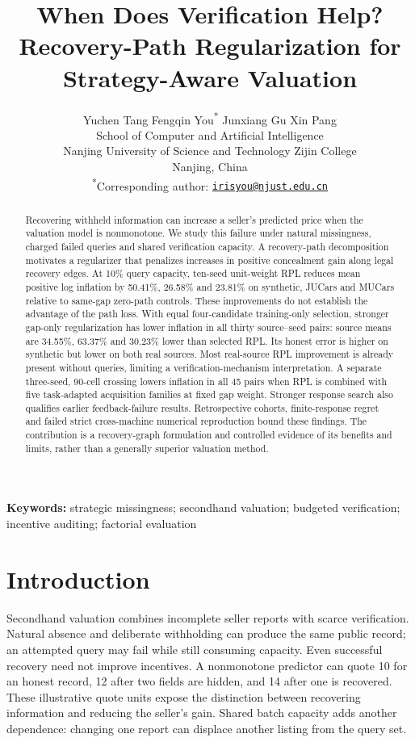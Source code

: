 \documentclass[11pt]{article}
\title{When Does Verification Help?\\Recovery-Path Regularization for Strategy-Aware Valuation}
\author{Yuchen Tang \quad Fengqin You\textsuperscript{*} \quad Junxiang Gu \quad Xin Pang\\[.5em]
\small School of Computer and Artificial Intelligence\\
\small Nanjing University of Science and Technology Zijin College\\
\small Nanjing, China\\[.4em]
\small \textsuperscript{*}Corresponding author: \href{mailto:irisyou@njust.edu.cn}{\texttt{irisyou@njust.edu.cn}}}
\date{}
\begin{document}
\maketitle
\begin{abstract}
Recovering withheld information can increase a seller's predicted price when the valuation model is nonmonotone. We study this failure under natural missingness, charged failed queries and shared verification capacity. A recovery-path decomposition motivates a regularizer that penalizes increases in positive concealment gain along legal recovery edges. At 10\% query capacity, ten-seed unit-weight RPL reduces mean positive log inflation by 50.41\%, 26.58\% and 23.81\% on synthetic, JUCars and MUCars relative to same-gap zero-path controls. These improvements do not establish the advantage of the path loss. With equal four-candidate training-only selection, stronger gap-only regularization has lower inflation in all thirty source--seed pairs: source means are 34.55\%, 63.37\% and 30.23\% lower than selected RPL. Its honest error is higher on synthetic but lower on both real sources. Most real-source RPL improvement is already present without queries, limiting a verification-mechanism interpretation. A separate three-seed, 90-cell crossing lowers inflation in all 45 pairs when RPL is combined with five task-adapted acquisition families at fixed gap weight. Stronger response search also qualifies earlier feedback-failure results. Retrospective cohorts, finite-response regret and failed strict cross-machine numerical reproduction bound these findings. The contribution is a recovery-graph formulation and controlled evidence of its benefits and limits, rather than a generally superior valuation method.
\end{abstract}

\noindent\textbf{Keywords:} strategic missingness; secondhand valuation; budgeted verification; incentive auditing; factorial evaluation

\section{Introduction}\label{sec:introduction}
Secondhand valuation combines incomplete seller reports with scarce
verification. Natural absence and deliberate withholding can produce the same
public record; an attempted query may fail while still consuming capacity.
Even successful recovery need not improve incentives. A nonmonotone predictor
can quote 10 for an honest record, 12 after two fields are hidden, and 14 after
one is recovered. These illustrative quote units expose the distinction
between recovering information and reducing the seller's gain. Shared batch
capacity adds another dependence: changing one report can displace another
listing from the query set.
\end{document}
